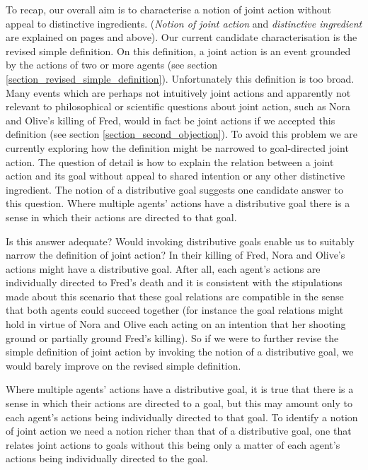 \documentclass[12pt,a4paper]{extarticle}
\begin{document}
To recap, our overall aim is to characterise a notion of joint action without appeal to distinctive ingredients. 
(\emph{Notion of joint action} and \emph{distinctive ingredient} are explained on pages \pageref{df_joint_action} and \pageref{df_distinctive_ingredient} above).
Our current candidate characterisation is the revised simple definition.
On this definition, a joint action is an event grounded by the actions of two or more agents 
(see section \ref{section_revised_simple_definition}).
Unfortunately this definition is too broad.
Many events which are perhaps not intuitively joint actions and apparently not relevant to philosophical or scientific questions about joint action, such as Nora and Olive's killing of Fred, would in fact be joint actions if we accepted this definition
(see section \ref{section_second_objection}).
To avoid this problem we are currently exploring how the definition might be narrowed to goal-directed joint action.
The question of detail is how to explain the relation between a joint action and its goal without appeal to shared intention or any other distinctive ingredient.
The notion of a distributive goal suggests one candidate answer to this question.
Where multiple agents' actions have a distributive goal there is a sense in which their actions are directed to that goal.  

Is this answer adequate?
Would invoking distributive goals enable us to suitably narrow the definition of joint action?
In their killing of Fred, Nora and Olive's actions might have a distributive goal.
After all, 
	each agent's actions are individually directed to Fred's death
	and  
	it is consistent with the stipulations made about this scenario that these goal relations are compatible in the sense that both agents could succeed together
(for instance the goal relations might hold in virtue of Nora and Olive each acting on an intention that her shooting ground or partially ground Fred's killing).
So if we were to further revise the simple definition of joint action by invoking the notion of a distributive goal, we would barely improve on the revised simple definition.

Where multiple agents' actions have a distributive goal, it is true that there is a sense in which their actions are directed to a goal, 
but this may amount only to each agent's actions being individually directed to that goal.  
To identify a notion of joint action we need a notion richer than that of a distributive goal, one that relates joint actions to goals without this being only a matter of each agent's actions being individually directed to the goal.
\end{document}
